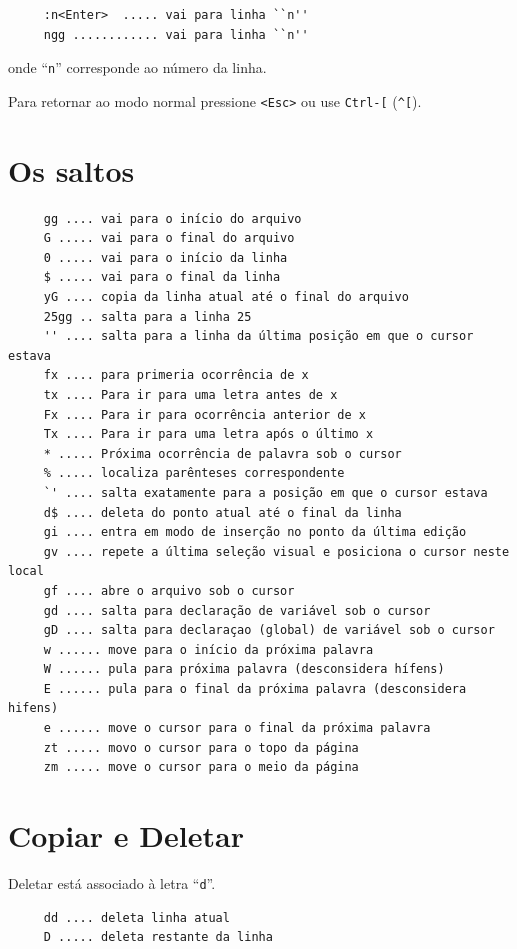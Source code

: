 \documentclass[10pt,a4paper,openany]{book}
\begin{document}
\begin{verbatim}
     :n<Enter>  ..... vai para linha ``n''
     ngg ............ vai para linha ``n''
\end{verbatim}

onde ``\verb|n|'' corresponde ao número da linha.

Para retornar ao modo normal pressione \verb|<Esc>| ou use \verb|Ctrl-[|
(\verb|^[|).

\section{Os saltos}\label{Os saltos}

\begin{verbatim}
     gg .... vai para o início do arquivo
     G ..... vai para o final do arquivo
     0 ..... vai para o início da linha
     $ ..... vai para o final da linha
     yG .... copia da linha atual até o final do arquivo
     25gg .. salta para a linha 25
     '' .... salta para a linha da última posição em que o cursor estava
     fx .... para primeria ocorrência de x
     tx .... Para ir para uma letra antes de x
     Fx .... Para ir para ocorrência anterior de x
     Tx .... Para ir para uma letra após o último x
     * ..... Próxima ocorrência de palavra sob o cursor
     % ..... localiza parênteses correspondente
     `' .... salta exatamente para a posição em que o cursor estava
     d$ .... deleta do ponto atual até o final da linha
     gi .... entra em modo de inserção no ponto da última edição
     gv .... repete a última seleção visual e posiciona o cursor neste local
     gf .... abre o arquivo sob o cursor
     gd .... salta para declaração de variável sob o cursor
     gD .... salta para declaraçao (global) de variável sob o cursor
     w ...... move para o início da próxima palavra
     W ...... pula para próxima palavra (desconsidera hífens)
     E ...... pula para o final da próxima palavra (desconsidera hifens)
     e ...... move o cursor para o final da próxima palavra
     zt ..... movo o cursor para o topo da página
     zm ..... move o cursor para o meio da página
\end{verbatim}

\section{Copiar e Deletar}\label{sec:Copiar e Deletar}

Deletar está associado à letra ``\verb|d|''.

\begin{verbatim}
     dd .... deleta linha atual
     D ..... deleta restante da linha
\end{verbatim}
\end{document}
